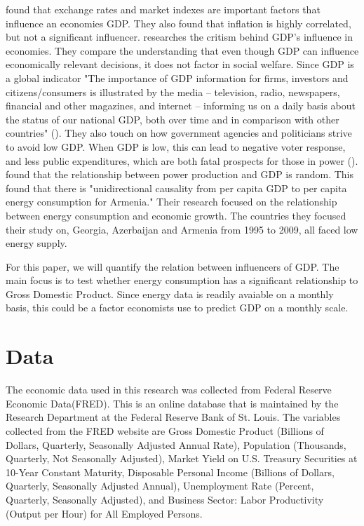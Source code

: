 \documentclass[12pt]{article}
\begin{document}
\citet{divya2014study} found that exchange rates and market indexes are important factors that influence an economies GDP. 
They also found that inflation is highly correlated, but not a significant influencer.  
\citet{van2009gdp} researches the critism behind GDP's influence in economies. They compare the understanding that even though GDP can influence economically relevant decisions, it does not factor in social welfare. 
Since GDP is a global indicator "The importance of GDP information for firms, investors and citizens/consumers is illustrated by the media – television, radio, newspapers, financial and other magazines, and internet – informing us on a daily basis about the status of our national GDP, both over time and in comparison with other countries" (\citet[]{van2009gdp}).
They also touch on how government agencies and politicians strive to avoid low GDP. When GDP is low, this can lead to negative voter response, and less public expenditures, which are both fatal prospects for those in power (\citet[]{van2009gdp}).
\citet{szustak2021relationship} found that the relationship between power production and GDP is random. This 
\citet{kalyoncu2013causality} found that there is "unidirectional causality from per capita GDP to per capita energy consumption for Armenia." Their research focused on the relationship between energy consumption and economic growth.
The countries they focused their study on, Georgia, Azerbaijan and Armenia from 1995 to 2009, all faced low energy supply. 

For this paper, we will quantify the relation between influencers of GDP. 
The main focus is to test whether energy consumption has a significant relationship to Gross Domestic Product. 
Since energy data is readily avaiable on a monthly basis, this could be a factor economists use to predict GDP on a monthly scale. 

\section*{Data}
The economic data used in this research was collected from Federal Reserve Economic Data(FRED). 
This is an online database that is maintained by the Research Department at the Federal Reserve Bank of St. Louis. 
The variables collected from the FRED website are Gross Domestic Product (Billions of Dollars, Quarterly, Seasonally Adjusted Annual Rate), Population (Thousands, Quarterly, Not Seasonally Adjusted), Market Yield on U.S. Treasury Securities at 10-Year Constant Maturity, Disposable Personal Income (Billions of Dollars, Quarterly, Seasonally Adjusted Annual), Unemployment Rate (Percent, Quarterly, Seasonally Adjusted), and Business Sector: Labor Productivity (Output per Hour) for All Employed Persons. 
\end{document}
